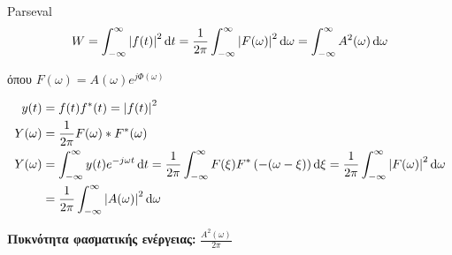      \begin{theorem*}[title=Θεώρημα Parseval,width=.8\textwidth]{Parseval}
        \begin{align*}
        W = \int_{-\infty}^{\infty} \left| f(t) \right|^2\mathop{}\!\mathrm{d} t
        =\frac{1}{2\pi}\int_{-\infty}^{\infty} \left|F(\omega )\right|^2
        \mathop{}\!\mathrm{d} \omega = \int_{-\infty}^{\infty} A^2(\omega )\mathop{}\!\mathrm{d} \omega
        \end{align*}

        όπου \( \displaystyle F(\omega ) = A(\omega )e^{j\varPhi(\omega )} \)
     \end{theorem*}

     \begin{align*}
     y(t) &= f(t)f^*(t)=\left|f(t)\right|^2 \\
     Y(\omega ) &= \frac{1}{2\pi} F(\omega )*F^*(\omega ) \\
     Y(\omega ) &= \int_{-\infty}^{\infty} y(t)e^{-j\omega t}\mathop{}\!\mathrm{d} t
     = \frac{1}{2\pi} \int_{-\infty}^{\infty} F(\xi) F^*\left(
     -(\omega -\xi) \right)\mathop{}\!\mathrm{d} \xi
     = \frac{1}{2\pi}\int_{-\infty}^{\infty} \left|F(\omega )\right|^2\mathop{}\!\mathrm{d} \omega
     \\ &= \frac{1}{2\pi}\int_{-\infty}^{\infty} \left|A(\omega )\right|^2\mathop{}\!\mathrm{d}\omega
     \end{align*}

     \begin{defn*}{}
        \textbf{Πυκνότητα φασματικής ενέργειας:}
        \(\displaystyle
        \frac{A^2(\omega)}{2\pi}
        \)
     \end{defn*}

